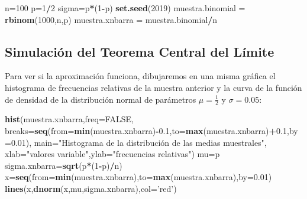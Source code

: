 \documentclass[]{book}
\newenvironment{Shaded}{\begin{snugshade}}{\end{snugshade}}
\newcommand{\DataTypeTok}[1]{\textcolor[rgb]{0.13,0.29,0.53}{#1}}
\newcommand{\DecValTok}[1]{\textcolor[rgb]{0.00,0.00,0.81}{#1}}
\newcommand{\FloatTok}[1]{\textcolor[rgb]{0.00,0.00,0.81}{#1}}
\newcommand{\KeywordTok}[1]{\textcolor[rgb]{0.13,0.29,0.53}{\textbf{#1}}}
\newcommand{\NormalTok}[1]{#1}
\newcommand{\OperatorTok}[1]{\textcolor[rgb]{0.81,0.36,0.00}{\textbf{#1}}}
\newcommand{\OtherTok}[1]{\textcolor[rgb]{0.56,0.35,0.01}{#1}}
\newcommand{\StringTok}[1]{\textcolor[rgb]{0.31,0.60,0.02}{#1}}
\begin{document}
\begin{Shaded}
\begin{Highlighting}[]
\NormalTok{n=}\DecValTok{100}
\NormalTok{p=}\DecValTok{1}\OperatorTok{/}\DecValTok{2}
\NormalTok{sigma=p}\OperatorTok{*}\NormalTok{(}\DecValTok{1}\OperatorTok{-}\NormalTok{p)}
\KeywordTok{set.seed}\NormalTok{(}\DecValTok{2019}\NormalTok{)}
\NormalTok{muestra.binomial =}\StringTok{ }\KeywordTok{rbinom}\NormalTok{(}\DecValTok{1000}\NormalTok{,n,p)}
\NormalTok{muestra.xnbarra =}\StringTok{ }\NormalTok{muestra.binomial}\OperatorTok{/}\NormalTok{n}
\end{Highlighting}
\end{Shaded}

\hypertarget{simulaciuxf3n-del-teorema-central-del-luxedmite-1}{%
\subsection{Simulación del Teorema Central del Límite}\label{simulaciuxf3n-del-teorema-central-del-luxedmite-1}}

Para ver si la aproximación funciona, dibujaremos en una misma gráfica el histograma de frecuencias relativas de la muestra anterior y la curva de la función de densidad de la distribución normal de parámetros \(\mu =\frac{1}{2}\) y \(\sigma = 0.05\):

\begin{Shaded}
\begin{Highlighting}[]
\KeywordTok{hist}\NormalTok{(muestra.xnbarra,}\DataTypeTok{freq=}\OtherTok{FALSE}\NormalTok{,}
     \DataTypeTok{breaks=}\KeywordTok{seq}\NormalTok{(}\DataTypeTok{from=}\KeywordTok{min}\NormalTok{(muestra.xnbarra)}\OperatorTok{-}\FloatTok{0.1}\NormalTok{,}\DataTypeTok{to=}\KeywordTok{max}\NormalTok{(muestra.xnbarra)}\OperatorTok{+}\FloatTok{0.1}\NormalTok{,}\DataTypeTok{by=}\FloatTok{0.01}\NormalTok{),}
     \DataTypeTok{main=}\StringTok{"Histograma de la distribución de las medias muestrales"}\NormalTok{,}
     \DataTypeTok{xlab=}\StringTok{"valores variable"}\NormalTok{,}\DataTypeTok{ylab=}\StringTok{"frecuencias relativas"}\NormalTok{)}
\NormalTok{mu=p}
\NormalTok{sigma.xnbarra=}\KeywordTok{sqrt}\NormalTok{(p}\OperatorTok{*}\NormalTok{(}\DecValTok{1}\OperatorTok{-}\NormalTok{p)}\OperatorTok{/}\NormalTok{n)}
\NormalTok{x=}\KeywordTok{seq}\NormalTok{(}\DataTypeTok{from=}\KeywordTok{min}\NormalTok{(muestra.xnbarra),}\DataTypeTok{to=}\KeywordTok{max}\NormalTok{(muestra.xnbarra),}\DataTypeTok{by=}\FloatTok{0.01}\NormalTok{)}
\KeywordTok{lines}\NormalTok{(x,}\KeywordTok{dnorm}\NormalTok{(x,mu,sigma.xnbarra),}\DataTypeTok{col=}\StringTok{'red'}\NormalTok{)}
\end{Highlighting}
\end{Shaded}
\end{document}
